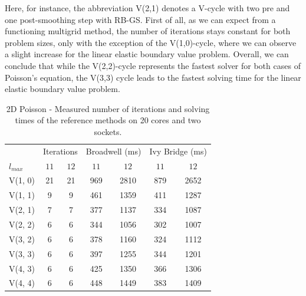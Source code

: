Here, for instance, the abbreviation V(2,1) denotes a V-cycle with two pre and one post-smoothing step with RB-GS.
First of all, as we can expect from a functioning multigrid method, the number of iterations stays constant for both problem sizes, only with the exception of the V(1,0)-cycle, where we can observe a slight increase for the linear elastic boundary value problem.
Overall, we can conclude that while the V(2,2)-cycle represents the fastest solver for both cases of Poisson's equation, the V(3,3) cycle leads to the fastest solving time for the linear elastic boundary value problem.
\begin{table}
	\caption{2D Poisson - Measured number of iterations and solving times of the reference methods on 20 cores and two sockets.}
	\label{table:poisson-2D-reference-methods}
	\centering
	\begin{tabular}{l c c c c c c}
		\toprule
		& \multicolumn{2}{c}{Iterations} & \multicolumn{2}{c}{Broadwell (ms)} & \multicolumn{2}{c}{Ivy Bridge (ms)} \\
		\cmidrule(r){2-3} \cmidrule(r){4-5} \cmidrule(r){6-7}
		$l_{max}$ & $11$& $12$ & $11$ & $12$ & $11$ & $12$\\
		\midrule
		V(1, 0) & 21 & 21 & 969 & 2810 & 879 & 2652 \\
		\midrule
		V(1, 1) & 9 & 9 & 461 & 1359 & 411 & 1287 \\
		\midrule
		V(2, 1) & 7 & 7 & 377 & 1137 & 334 & 1087\\
		\midrule
		V(2, 2) & 6 & 6 & 344 & 1056 & 302 & 1007 \\
		\midrule
		V(3, 2) & 6 & 6 & 378 & 1160 & 324 & 1112 \\
		\midrule
		V(3, 3) & 6 & 6 & 397 & 1255 & 344 & 1201 \\
		\midrule
		V(4, 3) & 6 & 6 & 425 & 1350 & 366 & 1306 \\
		\midrule
		V(4, 4) & 6 & 6 & 448 & 1449 & 383 & 1409\\
		\bottomrule
	\end{tabular}
\end{table}

